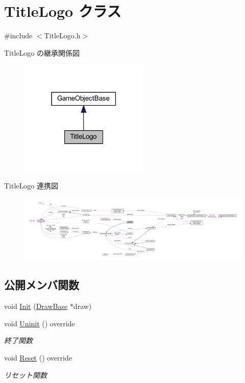 \hypertarget{class_title_logo}{}\section{Title\+Logo クラス}
\label{class_title_logo}


{\ttfamily \#include $<$Title\+Logo.\+h$>$}



Title\+Logo の継承関係図\nopagebreak
\begin{figure}[H]
\begin{center}
\leavevmode
\includegraphics[width=174pt]{class_title_logo__inherit__graph}
\end{center}
\end{figure}


Title\+Logo 連携図\nopagebreak
\begin{figure}[H]
\begin{center}
\leavevmode
\includegraphics[width=350pt]{class_title_logo__coll__graph}
\end{center}
\end{figure}
\subsection*{公開メンバ関数}
\begin{DoxyCompactItemize}
\item 
void \mbox{\hyperlink{class_title_logo_a1e07aae4771bd7a44cb7e3b55b72b9f3}{Init}} (\mbox{\hyperlink{class_draw_base}{Draw\+Base}} $\ast$draw)
\item 
void \mbox{\hyperlink{class_title_logo_a177943b3becc80fcdb7a34f131b07ee9}{Uninit}} () override
\begin{DoxyCompactList}\small\item\em 終了関数 \end{DoxyCompactList}\item 
void \mbox{\hyperlink{class_title_logo_a8bca39d06592b95b26024c2d86ac349c}{Reset}} () override
\begin{DoxyCompactList}\small\item\em リセット関数 \end{DoxyCompactList}\end{DoxyCompactItemize}
